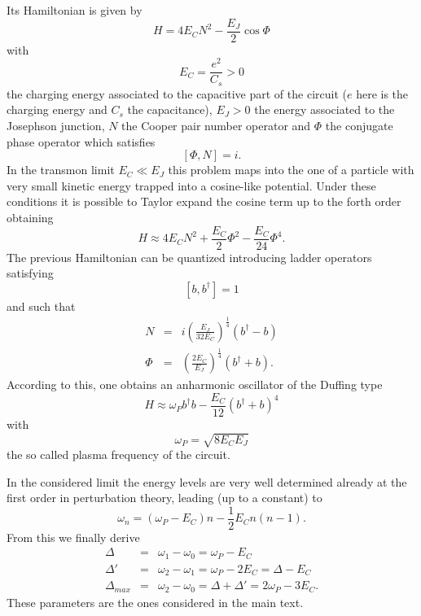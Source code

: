 \documentclass[12pt]{iopart}
\begin{document}
Its Hamiltonian is given by~\cite{Koch07, Krantz19}
\begin{equation}
H=4 E_{C}N^{2}-\frac{E_{J}}{2}\cos{\Phi}
\end{equation}
with 
\begin{equation}
E_{C}=\frac{e^{2}}{C_{s}}>0 
\end{equation} 
the charging energy associated to the capacitive part of the circuit ($e$ here is the charging energy and $C_{s}$ the capacitance), $E_{J}>0$ the energy associated to the Josephson junction, $N$ the Cooper pair number operator and $\Phi$ the conjugate phase operator which satisfies
\begin{equation}
\left[\Phi, N\right]=i.
\end{equation}
In the transmon limit $E_{C}\ll E_{J}$ this problem maps into the one of a particle with very small kinetic energy trapped into a cosine-like potential. Under these conditions it is possible to Taylor expand the cosine term up to the forth order obtaining 
\begin{equation}
H\approx4 E_{C}N^{2}+\frac{E_{C}}{2}\Phi^{2}-\frac{E_{C}}{24}\Phi^{4}.
\end{equation}
The previous Hamiltonian can be quantized introducing ladder operators satisfying
\begin{equation}
\left[b, b^{\dagger}\right]=1
\end{equation}
and such that 
\begin{eqnarray}
N&=& i \left(\frac{E_{J}}{32 E_{C}} \right)^{\frac{1}{4}}\left(b^{\dagger}-b \right)\\
\Phi&=& \left(\frac{2E_{C}}{E_{J}} \right)^{\frac{1}{4}}\left(b^{\dagger}+b \right).
\end{eqnarray}
According to this, one obtains an anharmonic oscillator of the Duffing type 
\begin{equation}
H\approx \omega_{P}b^{\dagger}b- \frac{E_{C}}{12}\left(b^{\dagger}+b\right)^{4}
\end{equation}
with 
\begin{equation}
\omega_{P}=\sqrt{8 E_{C} E_{J}}
\end{equation}
the so called plasma frequency of the circuit. 

In the considered limit the energy levels are very well determined already at the first order in perturbation theory, leading (up to a constant) to 
\begin{equation}
\omega_{n}=\left(\omega_{P}-E_{C}\right)n-\frac{1}{2}E_{C}n\left(n-1\right).
\end{equation}
From this we finally derive
\begin{eqnarray}
\Delta&=&\omega_{1}-\omega_{0}= \omega_{P}-E_{C}\\
\Delta'&=&\omega_{2}-\omega_{1}= \omega_{P}-2E_{C}=\Delta-E_{C}\\
\Delta_{max}&=& \omega_{2}-\omega_{0}=\Delta+\Delta'=2\omega_{P}-3E_{C}.
\end{eqnarray}
These parameters are the ones considered in the main text.
 
\end{document}
